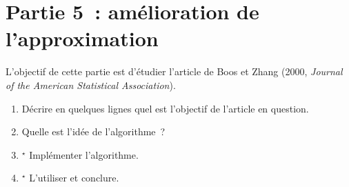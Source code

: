 \documentclass[a4paper,12pt,twosided]{article}
\theoremstyle{definition}
\begin{document}
\section*{Partie 5~: amélioration de l'approximation}

L'objectif de cette partie est d'étudier l'article de Boos et Zhang (2000, \textit{Journal of the
  American Statistical Association}). 

\begin{enumerate}[\bf {5.}1.]
\item Décrire en quelques lignes quel est l'objectif de l'article en question.
\item Quelle est l'idée de l'algorithme~?
\item $^\star$ Implémenter l'algorithme.
\item $^\star$ L'utiliser et conclure. 
\end{enumerate}
\end{document}
